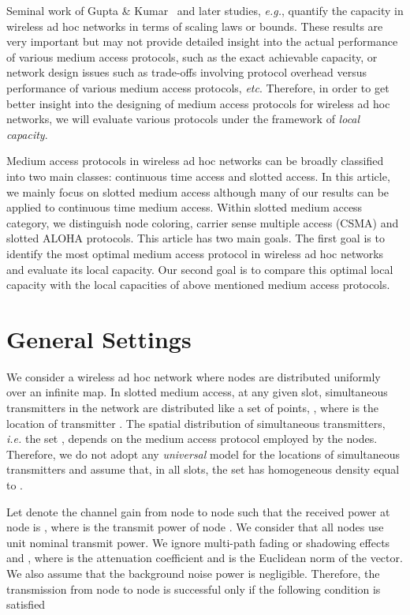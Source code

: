 \documentclass[12pt,english]{article}
\begin{document}
Seminal work of Gupta \& Kumar~\cite{Gupta:Kumar} and later studies, {\it e.g.}, \cite{scaling,scaling2} quantify the capacity in wireless ad hoc networks in terms of scaling laws or bounds. These results are very important but may not provide detailed insight into the actual performance of various medium access protocols, such as the exact achievable capacity, or network design issues such as trade-offs involving protocol overhead versus performance of various medium access protocols, {\it etc}. Therefore, in order to get better insight into the designing of medium access protocols for wireless ad hoc networks, we will evaluate various protocols under the framework of {\em local capacity}.

Medium access protocols in wireless ad hoc networks can be broadly classified into two main classes: continuous time access and slotted access. In this article, we mainly focus on slotted medium access although many of our results can be applied to continuous time medium access. Within slotted medium access category, we distinguish node coloring, carrier sense multiple access (CSMA) and slotted ALOHA protocols. This article has two main goals. The first goal is to identify the most optimal medium access protocol in wireless ad hoc networks and evaluate its local capacity. Our second goal is to compare this optimal local capacity with the local capacities of above mentioned medium access protocols.

\section{General Settings}
\label{sec:model}

We consider a wireless ad hoc network where nodes are distributed uniformly over an infinite  map. In slotted medium access, at any given slot, simultaneous transmitters in the network are distributed like a set of points, \mbox{}, where  is the location of transmitter . The spatial distribution of simultaneous transmitters, {\it i.e.} the set , depends on the medium access protocol employed by the nodes. Therefore, we do not adopt any {\em universal} model for the locations of simultaneous transmitters and assume that, in all slots, the set  has homogeneous density equal to . 

Let  denote the channel gain from node  to node  such that the received power at node  is , where  is the transmit power of node . We consider that all nodes use unit nominal transmit power. We ignore multi-path fading or shadowing effects and \mbox{}, where \mbox{} is the attenuation coefficient and  is the Euclidean norm of the vector. We also assume that the background noise power is negligible. Therefore, the transmission from node  to node  is successful only if the following condition is satisfied
\end{document}
